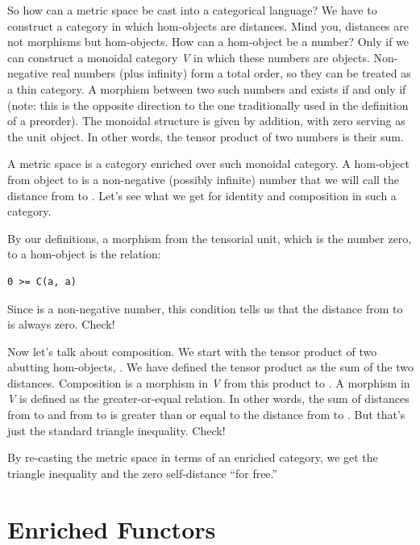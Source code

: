 So how can a metric space be cast into a categorical language? We have
to construct a category in which hom-objects are distances. Mind you,
distances are not morphisms but hom-objects. How can a hom-object be a
number? Only if we can construct a monoidal category \emph{V} in which
these numbers are objects. Non-negative real numbers (plus infinity)
form a total order, so they can be treated as a thin category. A
morphism between two such numbers  and  exists if
and only if  (note: this is the opposite
direction to the one traditionally used in the definition of a
preorder). The monoidal structure is given by addition, with zero
serving as the unit object. In other words, the tensor product of two
numbers is their sum.

A metric space is a category enriched over such monoidal category. A
hom-object  from object  to  is a
non-negative (possibly infinite) number that we will call the distance
from  to . Let's see what we get for identity and
composition in such a category.

By our definitions, a morphism from the tensorial unit, which is the
number zero, to a hom-object  is the relation:

\begin{verbatim}
0 >= C(a, a)
\end{verbatim}

Since  is a non-negative number, this condition tells
us that the distance from  to  is always zero.
Check!

Now let's talk about composition. We start with the tensor product of
two abutting hom-objects, . We have defined
the tensor product as the sum of the two distances. Composition is a
morphism in \emph{V} from this product to . A morphism
in \emph{V} is defined as the greater-or-equal relation. In other words,
the sum of distances from  to  and from 
to  is greater than or equal to the distance from 
to . But that's just the standard triangle inequality. Check!

By re-casting the metric space in terms of an enriched category, we get
the triangle inequality and the zero self-distance ``for free.''

\section{Enriched Functors}\label{enriched-functors}


